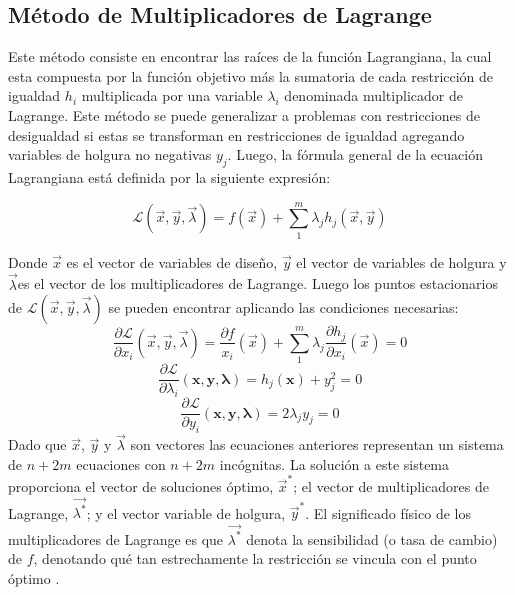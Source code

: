\subsection{Método de Multiplicadores de Lagrange} \label{sec:Método de Multiplicadores de Lagrange}
Este método consiste en encontrar las raíces de la función Lagrangiana, la cual esta compuesta por la función objetivo más la sumatoria de cada restricción de igualdad $h_i$ multiplicada por una variable $\lambda_i$ denominada multiplicador de Lagrange. Este método se puede generalizar a problemas con restricciones de desigualdad si estas se transforman en restricciones de igualdad agregando variables de holgura no negativas $y_j$. Luego, la fórmula general de la ecuación Lagrangiana está definida por la siguiente expresión:

\begin{equation}
\mathcal{L} (\vec{x},\vec{y},\vec{\lambda})=f(\vec{x})+ \sum_{1}^m \lambda_j h_j(\vec{x},\vec{y})
\end{equation}

Donde $\vec{x}$ es el vector de variables de diseño, $\vec{y}$ el vector de variables de holgura y $\vec{\lambda}$es el vector de los multiplicadores de Lagrange. Luego los puntos estacionarios de $\mathcal{L} (\vec{x},\vec{y},\vec{\lambda})$ se pueden encontrar aplicando las condiciones necesarias:
\begin{equation}
\frac{\partial \mathcal{L}}{\partial x_i} (\vec{x},\vec{y},\vec{\lambda})=\frac{\partial f}{x_i}(\vec{x})+ \sum_{1}^m \lambda_j \frac{\partial h_j}{\partial x_i} (\vec{x})=0
\end{equation}
\begin{equation}
\frac{\partial \mathcal{L}}{\partial \lambda_i} (\textbf{x},\textbf{y},\boldsymbol{\lambda})= h_j(\textbf{x})+y^2_j=0 
\end{equation}
\begin{equation}
\frac{\partial \mathcal{L}}{\partial y_i} (\textbf{x},\textbf{y},\boldsymbol{\lambda})=2 \lambda_j y_j=0
\end{equation}
Dado que $\vec{x}$, $\vec{y}$ y $\vec{\lambda}$ son vectores las ecuaciones anteriores representan un sistema de $n+2m$ ecuaciones con $n+2m$ incógnitas. La solución a este sistema proporciona  el vector de soluciones óptimo, $\vec{x}^*$; el vector de multiplicadores de Lagrange, $\vec{\lambda^*}$; y el vector variable de holgura, $\vec{y}^*$. El significado físico de los multiplicadores de Lagrange es que $\vec{\lambda^*}$ denota la sensibilidad (o tasa de cambio) de $f$, denotando qué tan estrechamente la restricción se vincula con el punto óptimo \cite{rao_engineering_2009}.

